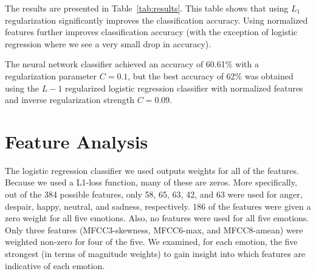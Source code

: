 \documentclass[twocolumn, 11pt]{article}
\begin{document}

The results are presented in Table~\ref{tab:results}. This table shows that
using $L_1$ regularization significantly improves the classification accuracy.
Using normalized features further improves classification accuracy (with the
exception of logistic regression where we see a very small drop in accuracy).

The neural network classifier achieved an accuracy of 60.61\% with a
regularization parameter $C=0.1$, but the best accuracy of 62\% was obtained
using the $L-1$ regularized logistic regression classifier with normalized
features and inverse regularization strength $C=0.09$.

\section{Feature Analysis}

The logistic regression classifier we used outputs weights for all of the
features. Because we used a L1-loss function, many of these are zeros. More
specifically, out of the 384 possible features, only 58, 65, 63, 42, and 63
were used for anger, despair, happy, neutral, and sadness, respectively. 186 of
the features were given a zero weight for all five emotions. Also, no features
were used for all five emotions. Only three features (MFCC3-skewness,
MFCC6-max, and MFCC8-amean) were weighted non-zero for four of the five. We
examined, for each emotion, the five strongest (in terms of magnitude weights)
to gain insight into which features are indicative of each emotion.
\end{document}
